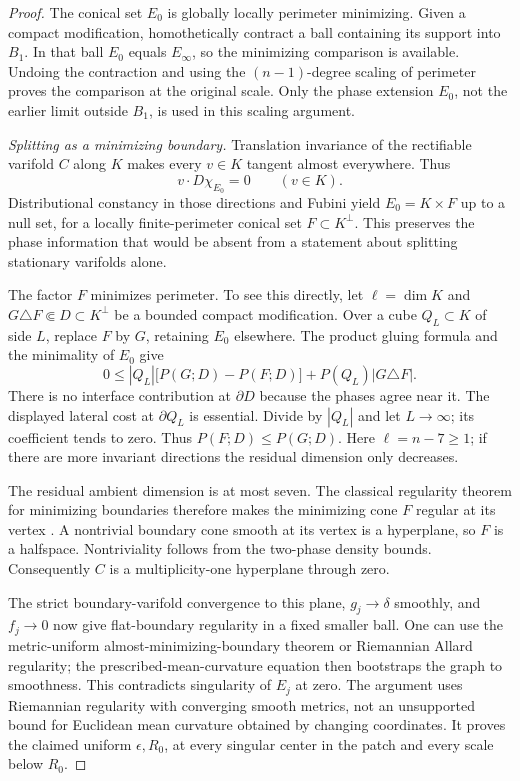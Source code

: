 \begin{proof}
The conical set $E_0$ is globally locally perimeter minimizing.
Given a compact modification, homothetically contract a ball
containing its support into $B_1$. In that ball $E_0$ equals
$E_\infty$, so the minimizing comparison is available.
Undoing the contraction and using the $(n-1)$-degree scaling
of perimeter proves the comparison at the original scale. Only
the phase extension $E_0$, not the earlier limit outside
$B_1$, is used in this scaling argument.

\emph{Splitting as a minimizing boundary.}
Translation invariance of the rectifiable varifold $C$ along
$K$ makes every $v\in K$ tangent almost everywhere. Thus
\[
 v\cdot D\chi_{E_0}=0\qquad(v\in K).
\]
Distributional constancy in those directions and Fubini yield
$E_0=K\times F$ up to a null set, for a locally
finite-perimeter conical set $F\subset K^\perp$.
This preserves the phase information that would be absent from
a statement about splitting stationary varifolds alone.

The factor $F$ minimizes perimeter. To see this directly, let
$\ell=\dim K$ and $G\triangle F\Subset D\subset K^\perp$
be a bounded compact modification. Over a cube $Q_L\subset K$
of side $L$, replace $F$ by $G$, retaining $E_0$ elsewhere.
The product gluing formula and the minimality of $E_0$ give
\[
 0\le |Q_L|\bigl[P(G;D)-P(F;D)\bigr]
                   +P(Q_L)|G\triangle F|.
\]
There is no interface contribution at $\partial D$ because
the phases agree near it. The displayed lateral cost at
$\partial Q_L$ is essential. Divide by $|Q_L|$ and let
$L\to\infty$; its coefficient tends to zero. Thus
$P(F;D)\le P(G;D)$. Here $\ell=n-7\ge1$; if there
are more invariant directions the residual dimension only
decreases.

The residual ambient dimension is at most seven. The classical
regularity theorem for minimizing boundaries therefore makes
the minimizing cone $F$ regular at its vertex
\cite{SimonGMT}. A nontrivial
boundary cone smooth at its vertex is a hyperplane, so $F$
is a halfspace. Nontriviality follows from the two-phase density
bounds. Consequently $C$ is a multiplicity-one hyperplane
through zero.

The strict boundary-varifold convergence to this plane,
$g_j\to\delta$ smoothly, and $f_j\to0$ now give
flat-boundary regularity in a fixed smaller ball. One can use
the metric-uniform almost-minimizing-boundary theorem or
Riemannian Allard regularity; the prescribed-mean-curvature
equation then bootstraps the graph to smoothness. This contradicts
singularity of $E_j$ at zero. The argument uses Riemannian
regularity with converging smooth metrics, not an unsupported
bound for Euclidean mean curvature obtained by changing
coordinates. It proves the claimed uniform $\epsilon,R_0$,
at every singular center in the patch and every scale below
$R_0$.


\end{proof}
